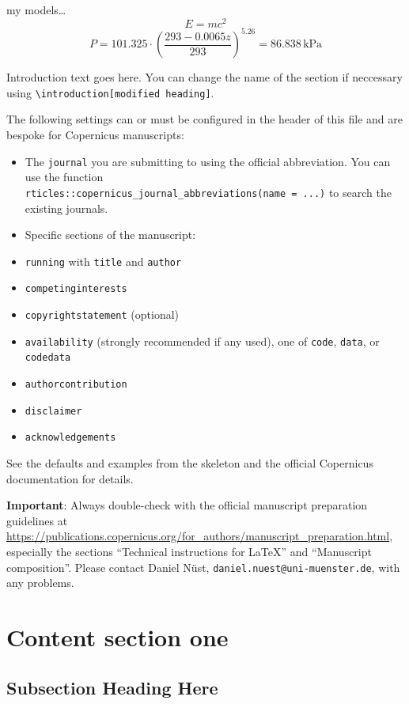\documentclass[ACP, manuscript]{copernicus}
\begin{document}
my models\ldots{} \[E = mc^2\] \[\begin{equation}
P=101.325 \cdot (\frac{293-0.0065z}{293}) ^ {5.26} = 86.838\,\text{kPa}
\end{equation}
\]

\conclusions
Introduction text goes here. You can change the name of the section if
neccessary using
\texttt{\textbackslash{}introduction{[}modified\ heading{]}}.

The following settings can or must be configured in the header of this
file and are bespoke for Copernicus manuscripts:

\begin{itemize}
\item
  The \texttt{journal} you are submitting to using the official
  abbreviation. You can use the function
  \texttt{rticles::copernicus\_journal\_abbreviations(name\ =\ \textquotesingle{}...\textquotesingle{})}
  to search the existing journals.
\item
  Specific sections of the manuscript:
\item
  \texttt{running} with \texttt{title} and \texttt{author}
\item
  \texttt{competinginterests}
\item
  \texttt{copyrightstatement} (optional)
\item
  \texttt{availability} (strongly recommended if any used), one of
  \texttt{code}, \texttt{data}, or \texttt{codedata}
\item
  \texttt{authorcontribution}
\item
  \texttt{disclaimer}
\item
  \texttt{acknowledgements}
\end{itemize}

See the defaults and examples from the skeleton and the official
Copernicus documentation for details.

\textbf{Important}: Always double-check with the official manuscript
preparation guidelines at
\url{https://publications.copernicus.org/for_authors/manuscript_preparation.html},
especially the sections ``Technical instructions for LaTeX'' and
``Manuscript composition''. Please contact Daniel Nüst,
\texttt{daniel.nuest@uni-muenster.de}, with any problems.

\section{Content section one}

\subsection{Subsection Heading Here}
\end{document}
